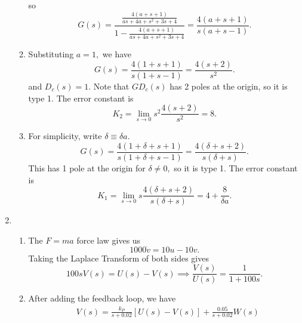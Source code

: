 \documentclass{article}
\numberwithin{equation}{section}
\begin{document}
\begin{enumerate}[label=\textbf{2.\arabic*}]
\begin{enumerate}[label=(\alph*)]
\begin{equation}
        \end{equation}
        so 
        \begin{equation}
            G(s) = \frac{\frac{4 (a + s + 1)}{a s + 4 a + s^{2} + 3 s + 4}}{1 - \frac{4 (a + s + 1)}{a s + 4 a + s^{2} + 3 s + 4}}  = \frac{4 (a + s + 1)}{s (a + s - 1)}.
        \end{equation}
        \item Substituting $a=1,$ we have 
        \begin{equation}
            G(s) = \frac{4 (1 + s + 1)}{s (1 + s - 1)} = \frac{4 (s + 2)}{s^{2}}.
        \end{equation}
        and $D_c(s) = 1.$ Note that $GD_c(s)$ has 2 poles at the origin, so it is type 1. The error constant is 
        \begin{equation}
            K_2 = \lim_{s\to 0} s^2\frac{4(s+2)}{s^2} = 8.
        \end{equation}
        \item For simplicity, write $\delta \equiv \delta a.$
        \begin{equation}
            G(s) =\frac{4 (1 + \delta + s + 1)}{s (1 + \delta + s - 1)} = \frac{4 (\delta + s + 2)}{s (\delta + s)}.
        \end{equation}
        This has 1 pole at the origin for $\delta \neq 0,$ so it is type 1. The error constant is 
        \begin{equation}
            K_1 = \lim_{s\to 0} s \frac{4(\delta +s + 2)}{s (\delta + s)} = 4 + \frac{8}{\delta a}.
        \end{equation}
    \end{enumerate}
    \item \begin{enumerate}[label=(\alph*)]
        \item The $F=ma$ force law gives us 
        \begin{equation}
            1000\dot{v} =  10u - 10v.
        \end{equation}
        Taking the Laplace Transform of both sides gives 
        \begin{equation}
            100 sV(s) = U(s) - V(s) \implies \frac{V(s)}{U(s)} = \frac{1}{1 +100s}.
        \end{equation}
        \item After adding the feedback loop, we have 
        \begin{align}
            &V(s) = \frac{k_P}{s+0.02}\left[U(s) - V(s)\right] + \frac{0.05}{s+0.02}W(s) \\ 

\end{align}
\end{enumerate}
\end{enumerate}
\end{document}
